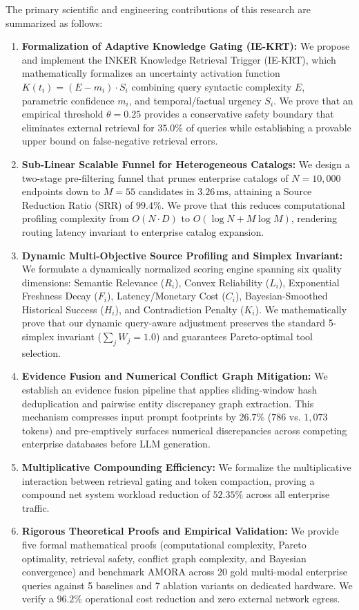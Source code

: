 \documentclass[journal,10pt,twocolumn]{IEEEtran}
\begin{document}
The primary scientific and engineering contributions of this research are summarized as follows:
\begin{enumerate}
    \item \textbf{Formalization of Adaptive Knowledge Gating (IE-KRT):} We propose and implement the INKER Knowledge Retrieval Trigger (IE-KRT), which mathematically formalizes an uncertainty activation function $K(t_i) = (E - m_i) \cdot S_i$ combining query syntactic complexity $E$, parametric confidence $m_i$, and temporal/factual urgency $S_i$. We prove that an empirical threshold $\theta = 0.25$ provides a conservative safety boundary that eliminates external retrieval for $35.0\%$ of queries while establishing a provable upper bound on false-negative retrieval errors.
    \item \textbf{Sub-Linear Scalable Funnel for Heterogeneous Catalogs:} We design a two-stage pre-filtering funnel that prunes enterprise catalogs of $N=10,000$ endpoints down to $M=55$ candidates in $3.26\,\text{ms}$, attaining a Source Reduction Ratio ($\text{SRR}$) of $99.4\%$. We prove that this reduces computational profiling complexity from $O(N \cdot D)$ to $O(\log N + M \log M)$, rendering routing latency invariant to enterprise catalog expansion.
    \item \textbf{Dynamic Multi-Objective Source Profiling and Simplex Invariant:} We formulate a dynamically normalized scoring engine spanning six quality dimensions: Semantic Relevance ($R_i$), Convex Reliability ($L_i$), Exponential Freshness Decay ($F_i$), Latency/Monetary Cost ($C_i$), Bayesian-Smoothed Historical Success ($H_i$), and Contradiction Penalty ($K_i$). We mathematically prove that our dynamic query-aware adjustment preserves the standard 5-simplex invariant ($\sum_{j} W_j = 1.0$) and guarantees Pareto-optimal tool selection.
    \item \textbf{Evidence Fusion and Numerical Conflict Graph Mitigation:} We establish an evidence fusion pipeline that applies sliding-window hash deduplication and pairwise entity discrepancy graph extraction. This mechanism compresses input prompt footprints by $26.7\%$ ($786$ vs. $1,073$ tokens) and pre-emptively surfaces numerical discrepancies across competing enterprise databases before LLM generation.
    \item \textbf{Multiplicative Compounding Efficiency:} We formalize the multiplicative interaction between retrieval gating and token compaction, proving a compound net system workload reduction of $52.35\%$ across all enterprise traffic.
    \item \textbf{Rigorous Theoretical Proofs and Empirical Validation:} We provide five formal mathematical proofs (computational complexity, Pareto optimality, retrieval safety, conflict graph complexity, and Bayesian convergence) and benchmark AMORA across 20 gold multi-modal enterprise queries against 5 baselines and 7 ablation variants on dedicated hardware. We verify a $96.2\%$ operational cost reduction and zero external network egress.
\end{enumerate}
\end{document}
